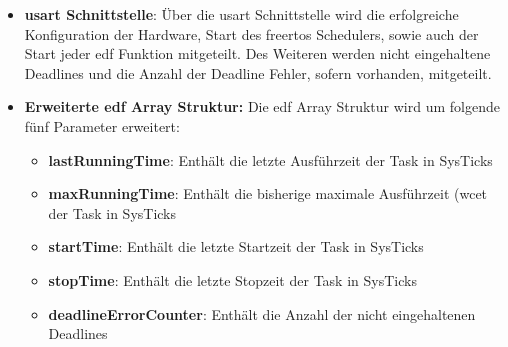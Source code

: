 \documentclass[../EDF Master Thesis.tex]{subfiles}
\begin{document}
    \begin{itemize}
        \item \textbf{\ac{usart} Schnittstelle}: Über die \ac{usart} Schnittstelle wird die erfolgreiche Konfiguration der Hardware, Start des \ac{freertos} Schedulers, sowie auch der Start jeder \ac{edf} Funktion mitgeteilt.
                                                 Des Weiteren werden nicht eingehaltene Deadlines und die Anzahl der Deadline Fehler, sofern vorhanden, mitgeteilt.
        \item \textbf{Erweiterte \ac{edf} Array Struktur:} Die \ac{edf} Array Struktur wird um folgende fünf Parameter erweitert:
        \begin{itemize}
            \item \textbf{lastRunningTime}: Enthält die letzte Ausführzeit der Task in SysTicks
            \item \textbf{maxRunningTime}: Enthält die bisherige maximale Ausführzeit (\ac{wcet} der Task in SysTicks
            \item \textbf{startTime}: Enthält die letzte Startzeit der Task in SysTicks
            \item \textbf{stopTime}: Enthält die letzte Stopzeit der Task in SysTicks
            \item \textbf{deadlineErrorCounter}: Enthält die Anzahl der nicht eingehaltenen Deadlines
        \end{itemize}
    \end{itemize}
    
\end{document}
